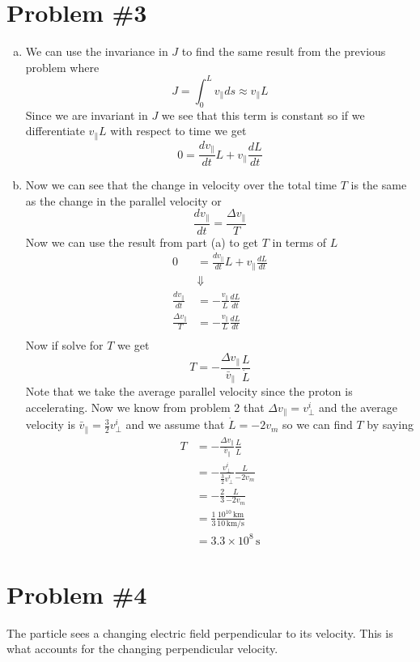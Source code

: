 \documentclass[11pt]{article}
\numberwithin{equation}{section}
\newcommand{\unit}[1]{\ensuremath{\, \mathrm{#1}}}
\begin{document}
\section{Problem \#3}
\begin{enumerate}[(a)]
\item
We can use the invariance in $J$ to find the same result from the previous problem where
$$J = \int_{0}^{L}v_{\parallel}ds \approx v_{\parallel}L$$
Since we are invariant in $J$ we see that this term is constant so if we differentiate $v_{\parallel}L$ with respect to time we get
$$0 = \frac{dv_{\parallel}}{dt}L+v_{\parallel}\frac{dL}{dt}$$

\item
Now we can see that the change in velocity over the total time $T$ is the same as the change in the parallel velocity or
$$\frac{dv_{\parallel}}{dt} = \frac{\Delta v_{\parallel}}{T}$$
Now we can use the result from part (a) to get $T$ in terms of $L$ 
\begin{align*}
0 &= \frac{dv_{\parallel}}{dt}L+v_{\parallel}\frac{dL}{dt}\\
&\Downarrow\\
\frac{dv_{\parallel}}{dt} &= -\frac{v_{\parallel}}{L}\frac{dL}{dt}\\
\frac{\Delta v_{\parallel}}{T} &= -\frac{v_{\parallel}}{L}\frac{dL}{dt}\\
\end{align*}
Now if solve for $T$ we get
$$T = -\frac{\Delta v_{\parallel}}{\bar{v}_{\parallel}}\frac{L}{\dot{L}}$$
Note that we take the average parallel velocity since the proton is accelerating. Now we know from problem 2 that $\Delta v_{\parallel} = v_{\perp}^i$ and the average velocity is $\bar{v}_{\parallel} = \frac{3}{2}v_{\perp}^i$ and we assume that $\dot{L} = -2v_m$ so we can find $T$ by saying
\begin{align*}
T &= -\frac{\Delta v_{\parallel}}{\bar{v}_{\parallel}}\frac{L}{\dot{L}}\\
&= -\frac{v^i_{\perp}}{\frac{3}{2}v^i_{\perp}}\frac{L}{-2v_m}\\
&= -\frac{2}{3}\frac{L}{-2v_m}\\
&= \frac{1}{3}\frac{10^{10}\unit{km}}{10\unit{km/s}}\\
&= 3.3\times10^{8}\unit{s}
\end{align*}
\end{enumerate}

\section{Problem \#4}
The particle sees a changing electric field perpendicular to its velocity. This is what accounts for the changing perpendicular velocity.
\end{document}
